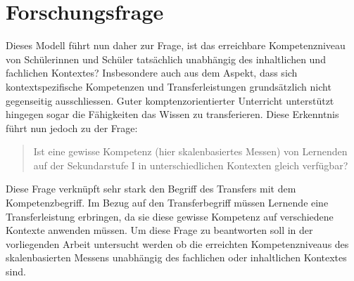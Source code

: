 \section{Forschungsfrage}

Dieses Modell führt nun daher zur Frage, ist das erreichbare Kompetenzniveau von Schülerinnen und Schüler tatsächlich unabhängig des inhaltlichen und fachlichen Kontextes? Insbesondere auch aus dem Aspekt, dass sich kontextspezifische Kompetenzen und Transferleistungen grundsätzlich nicht gegenseitig ausschliessen. Guter komptenzorientierter Unterricht unterstützt hingegen sogar die Fähigkeiten das Wissen zu transferieren. Diese Erkenntnis führt nun jedoch zu der Frage: 
\begin{quote}
Ist eine gewisse Kompetenz (hier skalenbasiertes Messen) von Lernenden auf der Sekundarstufe I in unterschiedlichen Kontexten gleich verfügbar?
\end{quote}

Diese Frage verknüpft sehr stark den Begriff des Transfers mit dem Kompetenzbegriff. Im
Bezug auf den Transferbegriff müssen Lernende eine Transferleistung erbringen, da sie
diese gewisse Kompetenz auf verschiedene Kontexte anwenden müssen. Um diese Frage zu beantworten soll in der vorliegenden Arbeit untersucht werden ob die erreichten Kompetenzniveaus des skalenbasierten Messens unabhängig des fachlichen oder inhaltlichen Kontextes sind.




